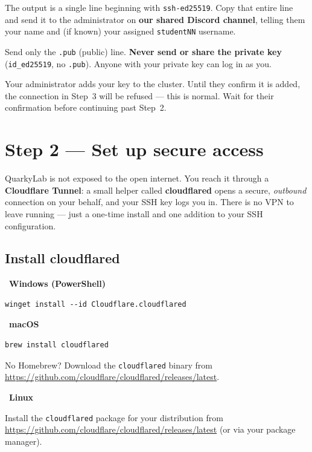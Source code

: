 \documentclass[11pt]{article}
\newcommand{\LabName}{QuarkyLab}                       %
\newcommand{\ContactVia}{our shared Discord channel}   %
\newcommand{\code}[1]{\texttt{#1}}
\newcommand{\osbadge}[1]{\vspace{0.4ex}\noindent{\color{quarkA}\rule{2pt}{10pt}}\ \textbf{\color{quarkA}#1}\par\nopagebreak\vspace{0.3ex}}
\begin{document}
The output is a single line beginning with \code{ssh-ed25519}. Copy that entire line and send it to the administrator on \textbf{\ContactVia}, telling them your name and (if known) your assigned \code{studentNN} username.

\begin{warnbox}
Send only the \code{.pub} (public) line. \textbf{Never send or share the private key} (\code{id\_ed25519}, no \code{.pub}). Anyone with your private key can log in as you.
\end{warnbox}

\begin{notebox}
Your administrator adds your key to the cluster. Until they confirm it is added, the connection in Step~3 will be refused --- this is normal. Wait for their confirmation before continuing past Step~2.
\end{notebox}

\section{Step 2 --- Set up secure access}
\LabName{} is not exposed to the open internet. You reach it through a \textbf{Cloudflare Tunnel}: a small helper called \textbf{cloudflared} opens a secure, \emph{outbound} connection on your behalf, and your SSH key logs you in. There is no VPN to leave running --- just a one-time install and one addition to your SSH configuration.

\subsection{Install cloudflared}
\osbadge{Windows (PowerShell)}
\begin{lstlisting}
winget install --id Cloudflare.cloudflared
\end{lstlisting}

\osbadge{macOS}
\begin{lstlisting}
brew install cloudflared
\end{lstlisting}
No Homebrew? Download the \code{cloudflared} binary from \url{https://github.com/cloudflare/cloudflared/releases/latest}.

\osbadge{Linux}
Install the \code{cloudflared} package for your distribution from \url{https://github.com/cloudflare/cloudflared/releases/latest} (or via your package manager).
\end{document}
